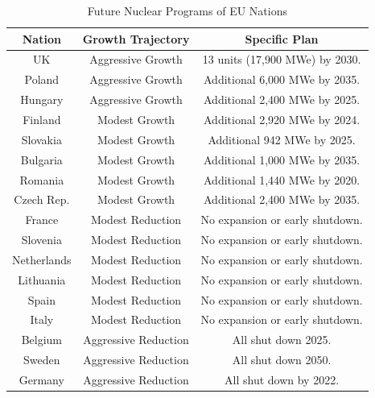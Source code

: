 \begin{table}[h]
    \centering
        \begin{tabular}{ccc}
            \hline 
                    
                    \textbf{Nation} & \textbf{Growth Trajectory} & \textbf{Specific Plan }\\
                    \hline
                    UK & Aggressive Growth & {\small  13 units (17,900 \gls{MWe}) by 2030.}\\
                    Poland & Aggressive Growth &  {\small Additional 6,000 \gls{MWe} by 2035.}\\
                    Hungary & Aggressive Growth &  {\small Additional 2,400 \gls{MWe} by 2025.} \\ 
                    Finland & Modest Growth &  {\small Additional 2,920 \gls{MWe} by 2024.}\\
                    Slovakia & Modest Growth & {\small Additional 942 \gls{MWe} by 2025.}\\
                    Bulgaria & Modest Growth &  {\small Additional 1,000 \gls{MWe} by 2035.} \\
                    Romania & Modest Growth &  {\small Additional 1,440 \gls{MWe} by 2020.} \\
                    Czech Rep. & Modest Growth & {\small  Additional 2,400 \gls{MWe} by 2035.}\\
                    France & Modest Reduction & {\small No expansion or early shutdown.}\\
                    Slovenia & Modest Reduction & {\small No expansion or early shutdown.}\\
                    Netherlands & Modest Reduction & {\small No expansion or early shutdown.}\\
                    Lithuania & Modest Reduction & {\small No expansion or early shutdown.}\\
                    Spain & Modest Reduction &  {\small No expansion or early shutdown.} \\
                    Italy & Modest Reduction & {\small No expansion or early shutdown. }\\
                    Belgium & Aggressive Reduction & All shut down 2025.\\
                    Sweden & Aggressive Reduction & All shut down 2050.\\
                    Germany & Aggressive Reduction & All shut down by 2022.\\
                    \hline
                    
        \end{tabular}

    \caption {Future Nuclear Programs of \gls{EU} Nations \cite{world_nuclear_association_nuclear_2017}}
  \label{tab:eu_growth}
\end{table}
\FloatBarrier

